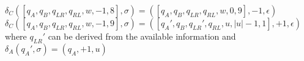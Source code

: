 \documentclass[12pt, a4paper]{article}
\begin{document}
\begin{algorithmic}
    \STATE $\delta_C([q_A, q_B, q_{LR}, q_{RL}, w, -1, 8], \sigma) = ([q_A, q_B, q_{LR}, q_{RL}, w, 0, 9], -1, \epsilon)$
    \STATE $\delta_C([q_A, q_B, q_{LR}, q_{RL}, w, -1, 9], \sigma) = ([q_A', q_B, q_{LR}', q_{RL}, u, |u|-1, 1], +1, \epsilon)$ where $q_{LR}'$ can be derived from the available information and $\delta_A(q_A', \sigma) = (q_A, +1, u)$


\end{algorithmic}



    
    
\end{document}
